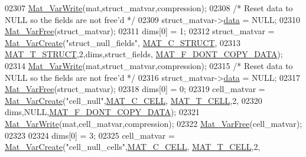 \begin{DoxyCode}
{{{{{02307         \hyperlink{group___m_a_t_ga4bd3eba12df415d8226e27c457fbbb0b}{Mat\_VarWrite}(mat,struct\_matvar,compression);
02308         \textcolor{comment}{/* Reset data to NULL so the fields are not free'd */}
02309         struct\_matvar->\hyperlink{group___m_a_t_a5672978efa230bbdecdf38ede781f7fa}{data} = NULL;
02310         \hyperlink{group___m_a_t_ga1d14716f7450530fd1c9d02413787f0e}{Mat\_VarFree}(struct\_matvar);
02311         dims[0] = 1;
02312         struct\_matvar = \hyperlink{group___m_a_t_ga1c54a84bb4d810c6fccdb8869489eac4}{Mat\_VarCreate}(\textcolor{stringliteral}{"struct\_null\_fields"},
      \hyperlink{group___m_a_t_ggad4d60ae7b709fc81bfd744fb4c857c40acb467c7749c80902b798134c729bb521}{MAT\_C\_STRUCT},
02313                             \hyperlink{group___m_a_t_ggacf7b3b879282b7ab3a51190e49bf3453a4f4d5a6e1d42c6aa81ffb810e5da5c85}{MAT\_T\_STRUCT},2,dims,struct\_fields,
      \hyperlink{group___m_a_t_ggab9d6ef9e3ddca78a317b173f01d53fbba762244499f52eb35e7b53fb79a1f2889}{MAT\_F\_DONT\_COPY\_DATA});
02314         \hyperlink{group___m_a_t_ga4bd3eba12df415d8226e27c457fbbb0b}{Mat\_VarWrite}(mat,struct\_matvar,compression);
02315         \textcolor{comment}{/* Reset data to NULL so the fields are not free'd */}
02316         struct\_matvar->\hyperlink{group___m_a_t_a5672978efa230bbdecdf38ede781f7fa}{data} = NULL;
02317         \hyperlink{group___m_a_t_ga1d14716f7450530fd1c9d02413787f0e}{Mat\_VarFree}(struct\_matvar);
02318         dims[0] = 0;
02319         cell\_matvar = \hyperlink{group___m_a_t_ga1c54a84bb4d810c6fccdb8869489eac4}{Mat\_VarCreate}(\textcolor{stringliteral}{"cell\_null"},\hyperlink{group___m_a_t_ggad4d60ae7b709fc81bfd744fb4c857c40a2f7abb47a1c51e248bd4e5e03cc81b08}{MAT\_C\_CELL},
      \hyperlink{group___m_a_t_ggacf7b3b879282b7ab3a51190e49bf3453a07599cf2cca6d2b2d059378563318ba5}{MAT\_T\_CELL},2,
02320                             dims,NULL,\hyperlink{group___m_a_t_ggab9d6ef9e3ddca78a317b173f01d53fbba762244499f52eb35e7b53fb79a1f2889}{MAT\_F\_DONT\_COPY\_DATA});
02321         \hyperlink{group___m_a_t_ga4bd3eba12df415d8226e27c457fbbb0b}{Mat\_VarWrite}(mat,cell\_matvar,compression);
02322         \hyperlink{group___m_a_t_ga1d14716f7450530fd1c9d02413787f0e}{Mat\_VarFree}(cell\_matvar);
02323 
02324         dims[0] = 3;
02325         cell\_matvar = \hyperlink{group___m_a_t_ga1c54a84bb4d810c6fccdb8869489eac4}{Mat\_VarCreate}(\textcolor{stringliteral}{"cell\_null\_cells"},\hyperlink{group___m_a_t_ggad4d60ae7b709fc81bfd744fb4c857c40a2f7abb47a1c51e248bd4e5e03cc81b08}{MAT\_C\_CELL},
      \hyperlink{group___m_a_t_ggacf7b3b879282b7ab3a51190e49bf3453a07599cf2cca6d2b2d059378563318ba5}{MAT\_T\_CELL},2,
}}}}}
\end{DoxyCode}
